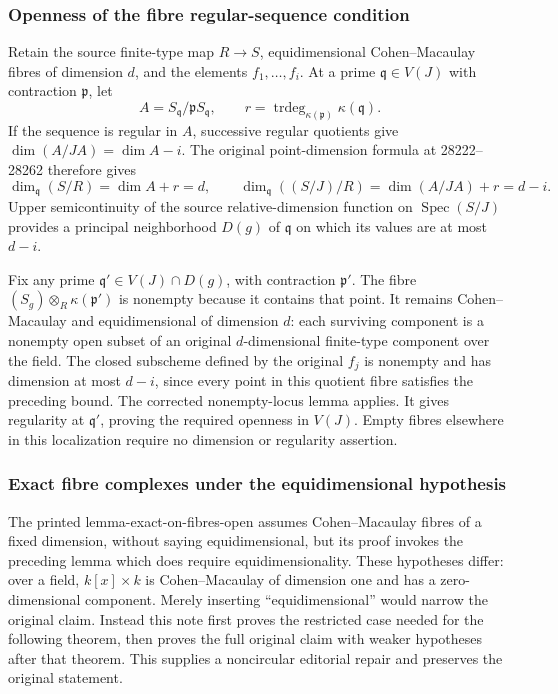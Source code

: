 \subsubsection{Openness of the fibre regular-sequence condition}\label{algebra-proof-039-openness-of-the-fibre-regular-sequence-condition}

Retain the source finite-type map \(R\to S\), equidimensional Cohen--Macaulay fibres of dimension \(d\), and the elements \(f_1,\ldots,f_i\). At a prime \(\mathfrak q\in V(J)\) with contraction \(\mathfrak p\), let \[
A=S_{\mathfrak q}/\mathfrak pS_{\mathfrak q},\qquad
r=\operatorname{trdeg}_{\kappa(\mathfrak p)}\kappa(\mathfrak q).
\] If the sequence is regular in \(A\), successive regular quotients give \(\dim(A/JA)=\dim A-i\). The original point-dimension formula at 28222--28262 therefore gives \[
\dim_{\mathfrak q}(S/R)=\dim A+r=d,\qquad
\dim_{\mathfrak q}((S/J)/R)=\dim(A/JA)+r=d-i.
\] Upper semicontinuity of the source relative-dimension function on \(\operatorname{Spec}(S/J)\) provides a principal neighborhood \(D(g)\) of \(\mathfrak q\) on which its values are at most \(d-i\).

Fix any prime \(\mathfrak q'\in V(J)\cap D(g)\), with contraction \(\mathfrak p'\). The fibre \((S_g)\otimes_R\kappa(\mathfrak p')\) is nonempty because it contains that point. It remains Cohen--Macaulay and equidimensional of dimension \(d\): each surviving component is a nonempty open subset of an original \(d\)-dimensional finite-type component over the field. The closed subscheme defined by the original \(f_j\) is nonempty and has dimension at most \(d-i\), since every point in this quotient fibre satisfies the preceding bound. The corrected nonempty-locus lemma applies. It gives regularity at \(\mathfrak q'\), proving the required openness in \(V(J)\). Empty fibres elsewhere in this localization require no dimension or regularity assertion.

\subsubsection{Exact fibre complexes under the equidimensional hypothesis}\label{algebra-proof-039-exact-fibre-complexes-under-the-equidimensional-hypothesis}

The printed lemma-exact-on-fibres-open assumes Cohen--Macaulay fibres of a fixed dimension, without saying equidimensional, but its proof invokes the preceding lemma which does require equidimensionality. These hypotheses differ: over a field, \(k[x]\times k\) is Cohen--Macaulay of dimension one and has a zero-dimensional component. Merely inserting ``equidimensional'' would narrow the original claim. Instead this note first proves the restricted case needed for the following theorem, then proves the full original claim with weaker hypotheses after that theorem. This supplies a noncircular editorial repair and preserves the original statement.

